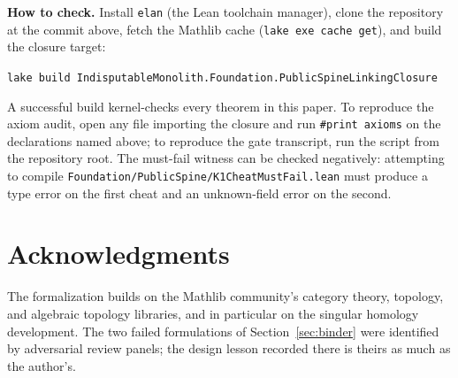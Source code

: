 \documentclass[11pt]{article}
\theoremstyle{definition}
\newcommand{\lean}[1]{\texttt{#1}}
\begin{document}
\textbf{How to check.} Install \lean{elan} (the Lean toolchain manager), clone the repository at the commit above, fetch the Mathlib cache (\lean{lake exe cache get}), and build the closure target:
\begin{center}
\lean{lake build IndisputableMonolith.Foundation.PublicSpineLinkingClosure}
\end{center}
A successful build kernel-checks every theorem in this paper. To reproduce the axiom audit, open any file importing the closure and run \lean{\#print axioms} on the declarations named above; to reproduce the gate transcript, run the script from the repository root. The must-fail witness can be checked negatively: attempting to compile \lean{Foundation/PublicSpine/K1CheatMustFail.lean} must produce a type error on the first cheat and an unknown-field error on the second.

\section*{Acknowledgments}

The formalization builds on the Mathlib community's category theory, topology, and algebraic topology libraries, and in particular on the singular homology development. The two failed formulations of Section~\ref{sec:binder} were identified by adversarial review panels; the design lesson recorded there is theirs as much as the author's.
\end{document}
